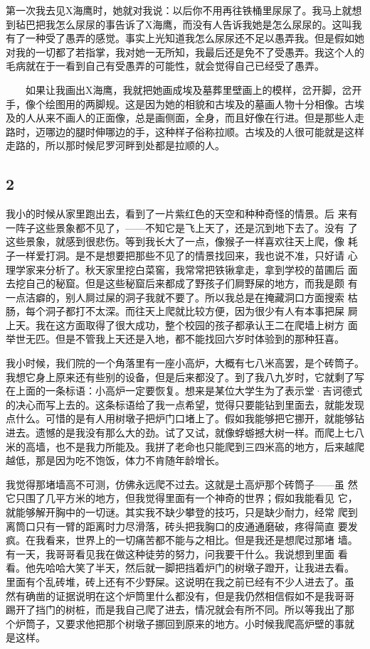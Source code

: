 第一次我去见X海鹰时，她就对我说：以后你不用再往铁桶里尿尿了。我马上就想到毡巴把我怎么尿尿的事告诉了X海鹰，而没有人告诉我她是怎么尿尿的。这叫我有了一种受了愚弄的感觉。事实上光知道我怎么尿尿还不足以愚弄我。但是假如她对我的一切都了若指掌，我对她一无所知，我最后还是免不了受愚弄。我这个人的毛病就在于一看到自己有受愚弄的可能性，就会觉得自己已经受了愚弄。

　　如果让我画出X海鹰，我就把她画成埃及墓葬里壁画上的模样，岔开脚，岔开手，像个绘图用的两脚规。这是因为她的相貌和古埃及的墓画人物十分相像。古埃及的人从来不画人的正面像，总是画侧面，全身，而且好像在行进。但是那些人走路时，迈哪边的腿时伸哪边的手，这种样子俗称拉顺。古埃及的人很可能就是这样走路的，所以那时候尼罗河畔到处都是拉顺的人。

\subsection{2}

我小的时候从家里跑出去，看到了一片紫红色的天空和种种奇怪的情景。后
来有一阵子这些景象都不见了，——不知它是飞上天了，还是沉到地下去了。没有
了这些景象，就感到很悲伤。等到我长大了一点，像猴子一样喜欢往天上爬，像
耗子一样爱打洞。是不是想要把那些不见了的情景找回来，我也说不准，只好请
心理学家来分析了。秋天家里挖白菜窖，我常常把铁锹拿走，拿到学校的苗圃后
面去挖自己的秘窟。但是这些秘窟后来都成了野孩子们屙野屎的地方，而我是颇
有一点洁癖的，别人屙过屎的洞子我就不要了。所以我总是在掩藏洞口方面搜索
枯肠，每个洞子都打不太深。而往天上爬就比较方便，因为很少有人有本事把屎
屙上天。我在这方面取得了很大成功，整个校园的孩子都承认王二在爬墙上树方
面举世无匹。但是不管我上天还是入地，都不能找回六岁时体验到的那种狂喜。

我小时候，我们院的一个角落里有一座小高炉，大概有七八米高罢，是个砖筒子。我想它身上原来还有些别的设备，但是后来都没了。到了我八九岁时，它就剩了写在上面的一条标语：小高炉一定要恢复。想来是某位大学生为了表示堂·吉诃德式的决心而写上去的。这条标语给了我一点希望，觉得只要能钻到里面去，就能发现点什么。可惜的是有人用树墩子把炉门口堵上了。假如我能够把它挪开，就能够钻进去。遗憾的是我没有那么大的劲。试了又试，就像蜉蝣撼大树一样。而爬上七八米的高墙，也不是我力所能及。我拼了老命也只能爬到三四米高的地方，后来越爬越低，那是因为吃不饱饭，体力不肯随年龄增长。

我觉得那堵墙高不可测，仿佛永远爬不过去。这就是土高炉那个砖筒子——虽
然它只围了几平方米的地方，但我觉得里面有一个神奇的世界；假如我能看见
它，就能够解开胸中的一切谜。其实我不缺少攀登的技巧，只是缺少耐力，经常
爬到离筒口只有一臂的距离时力尽滑落，砖头把我胸口的皮通通磨破，疼得简直
要发疯。在我看来，世界上的一切痛苦都不能与之相比。但是我还是想爬过那堵
墙。有一天，我哥哥看见我在做这种徒劳的努力，问我要干什么。我说想到里面
看看。他先哈哈大笑了半天，然后就一脚把挡着炉门的树墩子蹬开，让我进去看。
里面有个乱砖堆，砖上还有不少野屎。这说明在我之前已经有不少人进去了。虽
然有确凿的证据说明在这个炉筒里什么都没有，但是我仍然相信假如不是我哥哥
踢开了挡门的树桩，而是我自己爬了进去，情况就会有所不同。所以等我出了那
个炉筒子，又要求他把那个树墩子挪回到原来的地方。小时候我爬高炉壁的事就
是这样。

